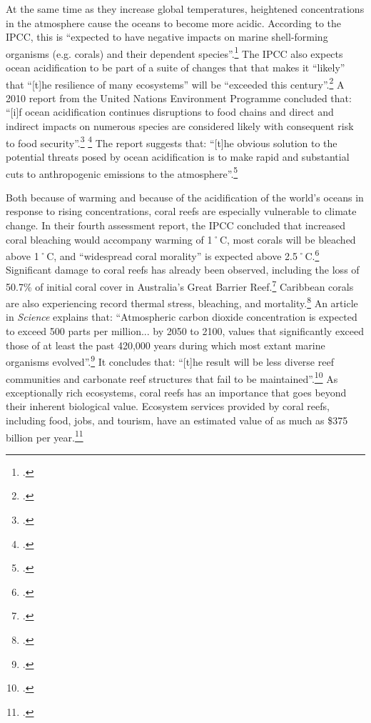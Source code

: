 At the same time as they increase global temperatures, heightened  concentrations in the atmosphere cause the oceans to become more acidic.
According to the IPCC, this is ``expected to have negative impacts on marine shell-forming organisms (e.g. corals) and their dependent species''.\footcite[][p. 52]{IPCCar4_syr}
The IPCC also expects ocean acidification to be part of a suite of changes that that makes it ``likely'' that ``[t]he resilience of many ecosystems'' will be ``exceeded this century''.\footcite[][p. 48]{IPCCar4_syr}
A 2010 report from the United Nations Environment Programme concluded that: ``[i]f ocean acidification continues 
disruptions to food chains and direct and indirect impacts on numerous species are considered likely with consequent risk to food security''.\footcite[][p. 8]{UNEPOceanAcid} \footcite[See also: ][]{AcidThreatFish}
The report suggests that: ``[t]he obvious solution to the potential threats posed by ocean acidification is to make rapid and substantial cuts to anthropogenic  emissions to the atmosphere''.\footcite[][p. 8]{UNEPOceanAcid}



Both because of warming and because of the acidification of the world's oceans in response to rising  concentrations, coral reefs are especially vulnerable to climate change.
In their fourth assessment report, the IPCC concluded that increased coral bleaching would accompany warming of 1˚C, most corals will be bleached above 1˚C, and ``widespread coral morality'' is expected above 2.5˚C.\footcite[][p.51]{IPCCar4_syr}
Significant damage to coral reefs has already been observed, including the loss of 50.7\% of initial coral cover in Australia's Great Barrier Reef.\footcite[][]{27declinecoral}
Caribbean corals are also experiencing record thermal stress, bleaching, and mortality.\footcite[][]{CaribbeanCorals}
An article in \emph{Science} explains that: ``Atmospheric carbon dioxide concentration is expected to exceed 500 parts per million... by 2050 to 2100, values that significantly exceed those of at least the past 420,000 years during which most extant marine organisms evolved''.\footcite[][p. 1737--1742]{CoralRapidCC}
It concludes that: ``[t]he result will be less diverse reef communities and carbonate reef structures that fail to be maintained''.\footcite[][p. 1737--1742]{CoralRapidCC}
As exceptionally rich ecosystems, coral reefs has an importance that goes beyond their inherent biological value.
Ecosystem services provided by coral reefs, including food, jobs, and tourism, have an estimated value of as much as \$375 billion per year.\footcite[][]{NOAACoral}



